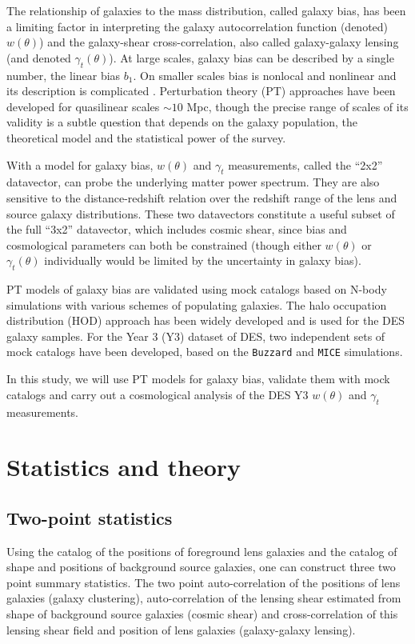 \documentclass[fleqn,usenatbib]{mnras}
\newcommand{\mice}{\texttt{MICE} }
\newcommand{\buzzard}{\texttt{Buzzard} }
\begin{document}
The relationship of galaxies to the mass distribution, called galaxy bias, has been a limiting factor in interpreting the galaxy autocorrelation function (denoted) $w(\theta)$) and the galaxy-shear cross-correlation, also called galaxy-galaxy lensing (and denoted $\gamma_t(\theta)$). At large scales, galaxy bias can be described by a single number, the linear bias $b_1$. On smaller scales bias is nonlocal and nonlinear and its description is complicated \citep{Fry_93,Scherrer_98}. Perturbation theory (PT) approaches have been developed for quasilinear scales $\sim 10$ Mpc, though the precise range of scales of its validity is a subtle question that depends on the galaxy population, the theoretical model and the statistical power of the survey. 

With a model for galaxy bias, $w(\theta)$ and $\gamma_t$ measurements, called the ``2x2'' datavector,   can probe the underlying matter power spectrum. They are also sensitive to the distance-redshift relation over the redshift range of the lens and source galaxy distributions.  These two datavectors constitute a useful subset of the full ``3x2'' datavector, which includes cosmic shear, since bias and cosmological parameters can both be constrained (though either $w(\theta)$ or $\gamma_t(\theta)$ individually would be limited by the uncertainty in galaxy bias). 

PT models of galaxy bias are validated using mock catalogs based on N-body simulations with various schemes of populating galaxies. The halo occupation distribution (HOD) approach has been widely developed and is used for the DES galaxy samples. For the Year 3 (Y3) dataset of DES, two independent sets of mock catalogs have been developed, based on the \buzzard and \mice simulations. 

In this study, we will use PT models for galaxy bias, validate them with mock catalogs and carry out a cosmological analysis of the DES Y3 $w(\theta)$ and $\gamma_t$ measurements.




\section{Statistics and theory}
\label{sec:stat_theory}
\subsection{Two-point statistics}
Using the catalog of the positions of foreground lens galaxies and the catalog of shape and positions of background source galaxies, one can construct three two point summary statistics. The two point auto-correlation of the positions of lens galaxies (galaxy clustering), auto-correlation of the lensing shear estimated from shape of background source galaxies (cosmic shear) and  cross-correlation of this lensing shear field and position of lens galaxies (galaxy-galaxy lensing). 
\end{document}
